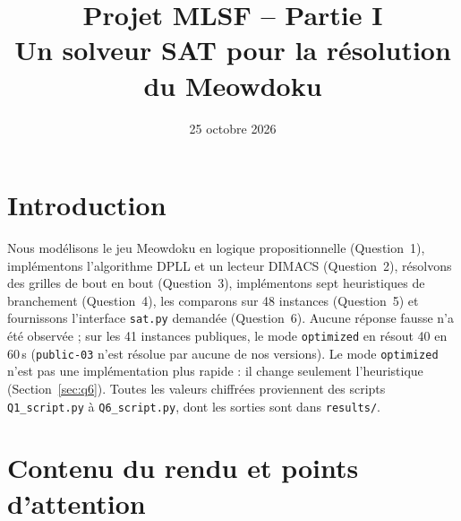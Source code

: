\documentclass[11pt,a4paper]{article}
\title{Projet MLSF -- Partie I\\Un solveur SAT pour la résolution du Meowdoku}
\author{\auteurs}
\date{25 octobre 2026}
\begin{document}
\maketitle

\section*{Introduction}
Nous modélisons le jeu Meowdoku en logique propositionnelle (Question~1), implémentons l'algorithme DPLL et un lecteur DIMACS (Question~2), résolvons des grilles de bout en bout (Question~3), implémentons sept heuristiques de branchement (Question~4), les comparons sur 48 instances (Question~5) et fournissons l'interface \texttt{sat.py} demandée (Question~6). Aucune réponse fausse n'a été observée ; sur les 41 instances publiques, le mode \texttt{optimized} en résout 40 en 60\,s (\texttt{public-03} n'est résolue par aucune de nos versions). Le mode \texttt{optimized} n'est pas une implémentation plus rapide : il change seulement l'heuristique (Section~\ref{sec:q6}). Toutes les valeurs chiffrées proviennent des scripts \texttt{Q1\_script.py} à \texttt{Q6\_script.py}, dont les sorties sont dans \texttt{results/}.

\section*{Contenu du rendu et points d'attention}
\end{document}
